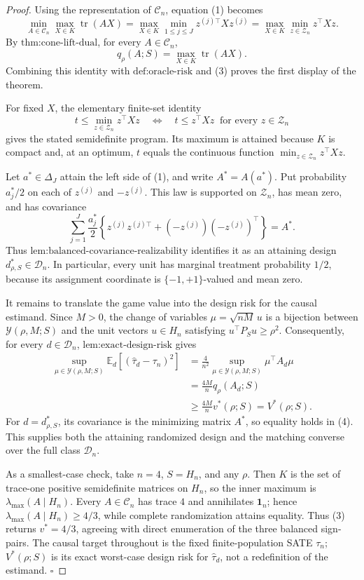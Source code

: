 \documentclass{article}
\begin{document}
\begin{proof}
Using the representation of \(\mathcal C_n\), equation (1) becomes
\[
\min_{A\in\mathcal C_n}\max_{X\in K}\operatorname{tr}(AX)
=
\max_{X\in K}\min_{1\leq j\leq J}z^{(j)\top}Xz^{(j)}
=
\max_{X\in K}\min_{z\in\mathcal Z_n}z^\top Xz.
\tag{3}
\]
By \(\text{thm:cone-lift-dual}\), for every \(A\in\mathcal C_n\),
\[
q_\rho(A;S)=\max_{X\in K}\operatorname{tr}(AX).
\]
Combining this identity with \(\text{def:oracle-risk}\) and (3) proves the first display of the theorem.

For fixed \(X\), the elementary finite-set identity
\[
t\leq\min_{z\in\mathcal Z_n}z^\top Xz
\quad\Longleftrightarrow\quad
t\leq z^\top Xz\ \text{ for every }z\in\mathcal Z_n
\]
gives the stated semidefinite program.  Its maximum is attained because \(K\) is compact and, at an optimum, \(t\) equals the continuous function \(\min_{z\in\mathcal Z_n}z^\top Xz\).

Let \(a^*\in\Delta_J\) attain the left side of (1), and write \(A^*=A(a^*)\).  Put probability \(a_j^*/2\) on each of \(z^{(j)}\) and \(-z^{(j)}\).  This law is supported on \(\mathcal Z_n\), has mean zero, and has covariance
\[
\sum_{j=1}^J\frac{a_j^*}{2}
\left\{z^{(j)}z^{(j)\top}+(-z^{(j)})(-z^{(j)})^\top\right\}=A^*.
\]
Thus \(\text{lem:balanced-covariance-realizability}\) identifies it as an attaining design \(d^*_{\rho,S}\in\mathcal D_n\).  In particular, every unit has marginal treatment probability \(1/2\), because its assignment coordinate is \(\{-1,+1\}\)-valued and mean zero.

It remains to translate the game value into the design risk for the causal estimand.  Since \(M>0\), the change of variables \(\mu=\sqrt{nM}\,u\) is a bijection between \(\mathcal Y(\rho,M;S)\) and the unit vectors \(u\in H_n\) satisfying \(u^\top P_Su\geq\rho^2\).  Consequently, for every \(d\in\mathcal D_n\), \(\text{lem:exact-design-risk}\) gives
\[
\begin{aligned}
\sup_{\mu\in\mathcal Y(\rho,M;S)}
\mathbb E_d\!\left[(\widehat\tau_d-\tau_n)^2\right]
&=\frac{4}{n^2}\sup_{\mu\in\mathcal Y(\rho,M;S)}\mu^\top A_d\mu\\
&=\frac{4M}{n}q_\rho(A_d;S)\\
&\geq\frac{4M}{n}v^*(\rho;S)
=V^*(\rho;S).
\end{aligned}
\tag{4}
\]
For \(d=d^*_{\rho,S}\), its covariance is the minimizing matrix \(A^*\), so equality holds in (4).  This supplies both the attaining randomized design and the matching converse over the full class \(\mathcal D_n\).

As a smallest-case check, take \(n=4\), \(S=H_n\), and any \(\rho\).  Then \(K\) is the set of trace-one positive semidefinite matrices on \(H_n\), so the inner maximum is \(\lambda_{\max}(A\mid H_n)\).  Every \(A\in\mathcal C_n\) has trace \(4\) and annihilates \(\mathbf 1_n\); hence \(\lambda_{\max}(A\mid H_n)\geq4/3\), while complete randomization attains equality.  Thus (3) returns \(v^*=4/3\), agreeing with direct enumeration of the three balanced sign-pairs.  The causal target throughout is the fixed finite-population SATE \(\tau_n\); \(V^*(\rho;S)\) is its exact worst-case design risk for \(\widehat\tau_d\), not a redefinition of the estimand. \(\square\)
\end{proof}
\end{document}
